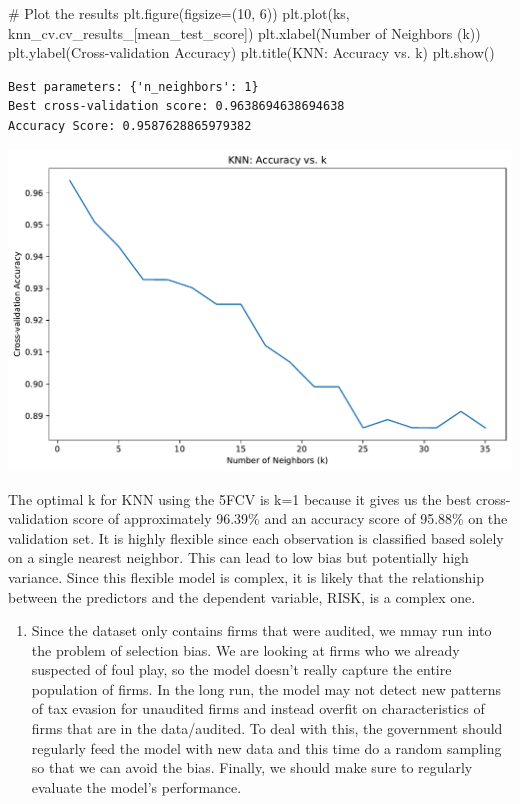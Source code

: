 \documentclass[
  11pt,
  letterpaper,
  DIV=11,
  numbers=noendperiod]{scrartcl}
\newenvironment{Shaded}{\begin{snugshade}}{\end{snugshade}}
\newcommand{\CommentTok}[1]{\textcolor[rgb]{0.37,0.37,0.37}{#1}}
\newcommand{\DecValTok}[1]{\textcolor[rgb]{0.68,0.00,0.00}{#1}}
\newcommand{\NormalTok}[1]{\textcolor[rgb]{0.00,0.23,0.31}{#1}}
\newcommand{\OperatorTok}[1]{\textcolor[rgb]{0.37,0.37,0.37}{#1}}
\newcommand{\StringTok}[1]{\textcolor[rgb]{0.13,0.47,0.30}{#1}}
\providecommand{\tightlist}{%
  \setlength{\itemsep}{0pt}\setlength{\parskip}{0pt}}\usepackage{longtable,booktabs,array}
\begin{document}
\begin{Shaded}
\begin{Highlighting}[]
\CommentTok{\# Plot the results}
\NormalTok{plt.figure(figsize}\OperatorTok{=}\NormalTok{(}\DecValTok{10}\NormalTok{, }\DecValTok{6}\NormalTok{))}
\NormalTok{plt.plot(ks, knn\_cv.cv\_results\_[}\StringTok{\textquotesingle{}mean\_test\_score\textquotesingle{}}\NormalTok{])}
\NormalTok{plt.xlabel(}\StringTok{\textquotesingle{}Number of Neighbors (k)\textquotesingle{}}\NormalTok{)}
\NormalTok{plt.ylabel(}\StringTok{\textquotesingle{}Cross{-}validation Accuracy\textquotesingle{}}\NormalTok{)}
\NormalTok{plt.title(}\StringTok{\textquotesingle{}KNN: Accuracy vs. k\textquotesingle{}}\NormalTok{)}
\NormalTok{plt.show()}
\end{Highlighting}
\end{Shaded}

\begin{verbatim}
Best parameters: {'n_neighbors': 1}
Best cross-validation score: 0.9638694638694638
Accuracy Score: 0.9587628865979382
\end{verbatim}

\includegraphics{mp2_files/figure-pdf/cell-22-output-2.pdf}

The optimal k for KNN using the 5FCV is k=1 because it gives us the best
cross-validation score of approximately 96.39\% and an accuracy score of
95.88\% on the validation set. It is highly flexible since each
observation is classified based solely on a single nearest neighbor.
This can lead to low bias but potentially high variance. Since this
flexible model is complex, it is likely that the relationship between
the predictors and the dependent variable, RISK, is a complex one.

\begin{enumerate}
\def\labelenumi{\arabic{enumi}.}
\setcounter{enumi}{8}
\tightlist
\item
  Since the dataset only contains firms that were audited, we mmay run
  into the problem of selection bias. We are looking at firms who we
  already suspected of foul play, so the model doesn't really capture
  the entire population of firms. In the long run, the model may not
  detect new patterns of tax evasion for unaudited firms and instead
  overfit on characteristics of firms that are in the data/audited. To
  deal with this, the government should regularly feed the model with
  new data and this time do a random sampling so that we can avoid the
  bias. Finally, we should make sure to regularly evaluate the model's
  performance.
\end{enumerate}
\end{document}

